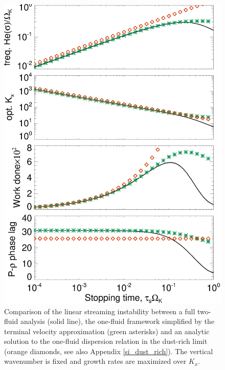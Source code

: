 \begin{figure}
\includegraphics[width=\linewidth]{figures/si_2f_1f_compare}
\caption{Comparison of the linear 
streaming instability between a full two-fluid analysis (solid 
line), the one-fluid framework simplified by the terminal 
velocity approximation (green asterisks) and an analytic solution to
the one-fluid dispersion relation in the dust-rich limit (orange
diamonds, see also Appendix \ref{si_dust_rich}). The vertical 
wavenumber is fixed and growth rates are maximized over $K_x$. 
\label{si_compare_fig}}
\end{figure}












